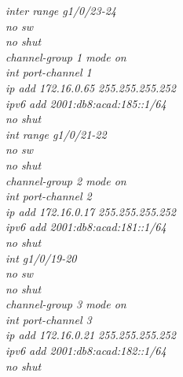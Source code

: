 \documentclass[a4paper, 12pt]{article}
\begin{document}
\hspace*{2cm}\textit{ inter range g1/0/23-24\\
\hspace*{2cm}no sw\\
\hspace*{2cm}no shut\\
\hspace*{2cm}channel-group 1 mode on\\
\hspace*{2cm}int port-channel 1\\
\hspace*{2cm}ip add 172.16.0.65 255.255.255.252\\
\hspace*{2cm}ipv6 add 2001:db8:acad:185::1/64\\
\hspace*{2cm}no shut\\
\hspace*{2cm}int range g1/0/21-22\\
\hspace*{2cm}no sw\\
\hspace*{2cm}no shut\\
\hspace*{2cm}channel-group 2 mode on\\
\hspace*{2cm}int port-channel 2\\
\hspace*{2cm}ip add 172.16.0.17 255.255.255.252\\
\hspace*{2cm}ipv6 add 2001:db8:acad:181::1/64\\
\hspace*{2cm}no shut\\
\hspace*{2cm}int g1/0/19-20\\
\hspace*{2cm}no sw\\
\hspace*{2cm}no shut\\
\hspace*{2cm}channel-group 3 mode on\\
\hspace*{2cm}int port-channel 3\\
\hspace*{2cm}ip add 172.16.0.21 255.255.255.252\\
\hspace*{2cm}ipv6 add 2001:db8:acad:182::1/64\\
\hspace*{2cm}no shut\\}
\end{document}
